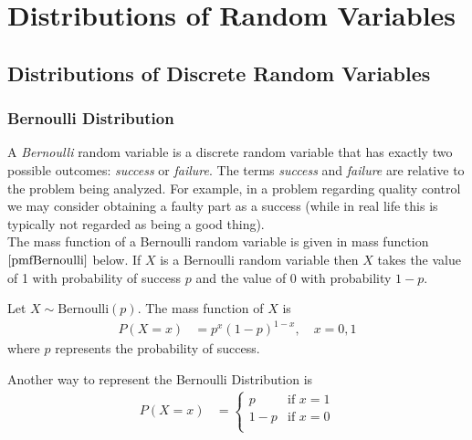 \chapter{Distributions of Random Variables}
\label{chapterDistributionsofRandomVariables}
\setcounter{equation}{0}


\section{Distributions of Discrete Random Variables}

\subsection{Bernoulli Distribution}
\label{sectionBernouli}

A \textit{Bernoulli} random variable is a discrete random variable that has exactly two possible outcomes: \textit{success} or \textit{failure}. 
The terms \textit{success} and \textit{failure} are relative to the problem being analyzed. 
For example, in a problem regarding quality control we may consider obtaining a faulty part as a success (while in real life this is typically not regarded as being a good thing).\\

The mass function of a Bernoulli random variable is given in mass function $\ref{pmfBernoulli}$ below. 
If $X$ is a Bernoulli random variable then $X$ takes the value of 1 with probability of success $p$ and the value of 0 with probability $1-p$.

\begin{pmf}
\label{pmfBernoulli}
Let $X \sim \text{Bernoulli}(p)$. 
The mass function of $X$ is
	\begin{align}
	P(X = x) & = p^{x}(1-p)^{1-x}, \quad x = 0, 1
	\end{align}
where $p$ represents the probability of success.
\end{pmf}

\noindent
Another way to represent the Bernoulli Distribution is
\begin{align}
P(X=x)	&=
	\begin{cases}
	p        & \text{if } x = 1 \\[0.5em]
	1-p        & \text{if } x = 0 \\
  \end{cases}
\end{align}

